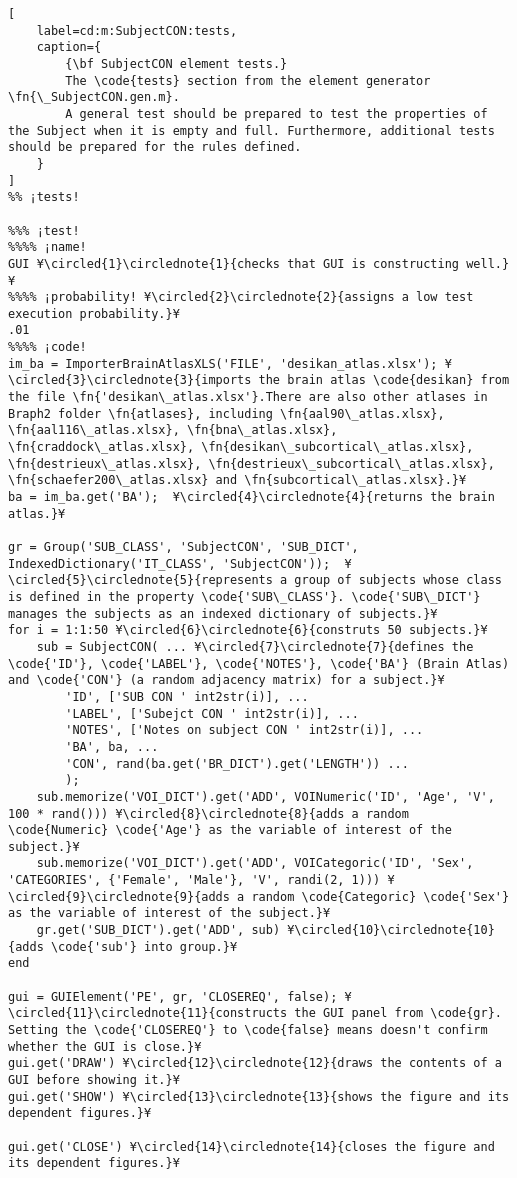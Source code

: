 \documentclass{tufte-handout}
\begin{document}
\clearpage

\begin{lstlisting}[
	label=cd:m:SubjectCON:tests,
	caption={
		{\bf SubjectCON element tests.}
		The \code{tests} section from the element generator \fn{\_SubjectCON.gen.m}.
		A general test should be prepared to test the properties of the Subject when it is empty and full. Furthermore, additional tests should be prepared for the rules defined.
	}
]			
%% ¡tests!

%%% ¡test!
%%%% ¡name!
GUI ¥\circled{1}\circlednote{1}{checks that GUI is constructing well.}¥
%%%% ¡probability! ¥\circled{2}\circlednote{2}{assigns a low test execution probability.}¥
.01
%%%% ¡code!
im_ba = ImporterBrainAtlasXLS('FILE', 'desikan_atlas.xlsx'); ¥\circled{3}\circlednote{3}{imports the brain atlas \code{desikan} from the file \fn{'desikan\_atlas.xlsx'}.There are also other atlases in Braph2 folder \fn{atlases}, including \fn{aal90\_atlas.xlsx}, \fn{aal116\_atlas.xlsx}, \fn{bna\_atlas.xlsx}, \fn{craddock\_atlas.xlsx}, \fn{desikan\_subcortical\_atlas.xlsx}, \fn{destrieux\_atlas.xlsx}, \fn{destrieux\_subcortical\_atlas.xlsx},  \fn{schaefer200\_atlas.xlsx} and \fn{subcortical\_atlas.xlsx}.}¥
ba = im_ba.get('BA');  ¥\circled{4}\circlednote{4}{returns the brain atlas.}¥

gr = Group('SUB_CLASS', 'SubjectCON', 'SUB_DICT', IndexedDictionary('IT_CLASS', 'SubjectCON'));  ¥\circled{5}\circlednote{5}{represents a group of subjects whose class is defined in the property \code{'SUB\_CLASS'}. \code{'SUB\_DICT'} manages the subjects as an indexed dictionary of subjects.}¥
for i = 1:1:50 ¥\circled{6}\circlednote{6}{construts 50 subjects.}¥
    sub = SubjectCON( ... ¥\circled{7}\circlednote{7}{defines the \code{'ID'}, \code{'LABEL'}, \code{'NOTES'}, \code{'BA'} (Brain Atlas) and \code{'CON'} (a random adjacency matrix) for a subject.}¥
        'ID', ['SUB CON ' int2str(i)], ...
        'LABEL', ['Subejct CON ' int2str(i)], ...
        'NOTES', ['Notes on subject CON ' int2str(i)], ...
        'BA', ba, ...
        'CON', rand(ba.get('BR_DICT').get('LENGTH')) ...
        );
    sub.memorize('VOI_DICT').get('ADD', VOINumeric('ID', 'Age', 'V', 100 * rand())) ¥\circled{8}\circlednote{8}{adds a random \code{Numeric} \code{'Age'} as the variable of interest of the subject.}¥
    sub.memorize('VOI_DICT').get('ADD', VOICategoric('ID', 'Sex', 'CATEGORIES', {'Female', 'Male'}, 'V', randi(2, 1))) ¥\circled{9}\circlednote{9}{adds a random \code{Categoric} \code{'Sex'} as the variable of interest of the subject.}¥
    gr.get('SUB_DICT').get('ADD', sub) ¥\circled{10}\circlednote{10}{adds \code{'sub'} into group.}¥
end

gui = GUIElement('PE', gr, 'CLOSEREQ', false); ¥\circled{11}\circlednote{11}{constructs the GUI panel from \code{gr}. Setting the \code{'CLOSEREQ'} to \code{false} means doesn't confirm whether the GUI is close.}¥
gui.get('DRAW') ¥\circled{12}\circlednote{12}{draws the contents of a GUI before showing it.}¥
gui.get('SHOW') ¥\circled{13}\circlednote{13}{shows the figure and its dependent figures.}¥

gui.get('CLOSE') ¥\circled{14}\circlednote{14}{closes the figure and its dependent figures.}¥
\end{lstlisting}
\end{document}
